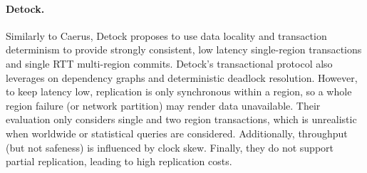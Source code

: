 

\paragraph{Detock.} Similarly to Caerus, Detock proposes to use data locality and transaction determinism to provide strongly consistent, low latency single-region transactions and single RTT multi-region commits.
Detock's transactional protocol also leverages on dependency graphs and deterministic deadlock resolution.
However, to keep latency low, replication is only synchronous within a region, so a whole region failure (or network partition) may render data unavailable.
Their evaluation only considers single and two region transactions, which is unrealistic when worldwide or statistical queries are considered.
Additionally, throughput (but not safeness) is influenced by clock skew.
Finally, they do not support partial replication, leading to high replication costs.

